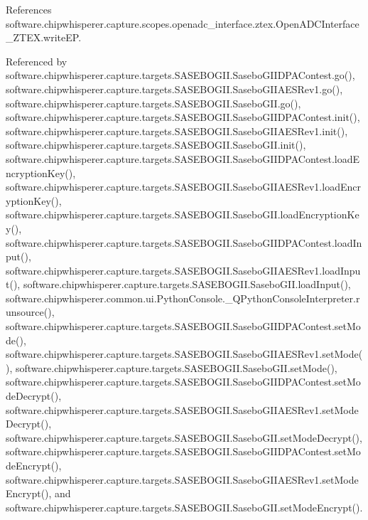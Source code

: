 References software.\+chipwhisperer.\+capture.\+scopes.\+openadc\+\_\+interface.\+ztex.\+Open\+A\+D\+C\+Interface\+\_\+\+Z\+T\+E\+X.\+write\+E\+P.



Referenced by software.\+chipwhisperer.\+capture.\+targets.\+S\+A\+S\+E\+B\+O\+G\+I\+I.\+Sasebo\+G\+I\+I\+D\+P\+A\+Contest.\+go(), software.\+chipwhisperer.\+capture.\+targets.\+S\+A\+S\+E\+B\+O\+G\+I\+I.\+Sasebo\+G\+I\+I\+A\+E\+S\+Rev1.\+go(), software.\+chipwhisperer.\+capture.\+targets.\+S\+A\+S\+E\+B\+O\+G\+I\+I.\+Sasebo\+G\+I\+I.\+go(), software.\+chipwhisperer.\+capture.\+targets.\+S\+A\+S\+E\+B\+O\+G\+I\+I.\+Sasebo\+G\+I\+I\+D\+P\+A\+Contest.\+init(), software.\+chipwhisperer.\+capture.\+targets.\+S\+A\+S\+E\+B\+O\+G\+I\+I.\+Sasebo\+G\+I\+I\+A\+E\+S\+Rev1.\+init(), software.\+chipwhisperer.\+capture.\+targets.\+S\+A\+S\+E\+B\+O\+G\+I\+I.\+Sasebo\+G\+I\+I.\+init(), software.\+chipwhisperer.\+capture.\+targets.\+S\+A\+S\+E\+B\+O\+G\+I\+I.\+Sasebo\+G\+I\+I\+D\+P\+A\+Contest.\+load\+Encryption\+Key(), software.\+chipwhisperer.\+capture.\+targets.\+S\+A\+S\+E\+B\+O\+G\+I\+I.\+Sasebo\+G\+I\+I\+A\+E\+S\+Rev1.\+load\+Encryption\+Key(), software.\+chipwhisperer.\+capture.\+targets.\+S\+A\+S\+E\+B\+O\+G\+I\+I.\+Sasebo\+G\+I\+I.\+load\+Encryption\+Key(), software.\+chipwhisperer.\+capture.\+targets.\+S\+A\+S\+E\+B\+O\+G\+I\+I.\+Sasebo\+G\+I\+I\+D\+P\+A\+Contest.\+load\+Input(), software.\+chipwhisperer.\+capture.\+targets.\+S\+A\+S\+E\+B\+O\+G\+I\+I.\+Sasebo\+G\+I\+I\+A\+E\+S\+Rev1.\+load\+Input(), software.\+chipwhisperer.\+capture.\+targets.\+S\+A\+S\+E\+B\+O\+G\+I\+I.\+Sasebo\+G\+I\+I.\+load\+Input(), software.\+chipwhisperer.\+common.\+ui.\+Python\+Console.\+\_\+\+Q\+Python\+Console\+Interpreter.\+runsource(), software.\+chipwhisperer.\+capture.\+targets.\+S\+A\+S\+E\+B\+O\+G\+I\+I.\+Sasebo\+G\+I\+I\+D\+P\+A\+Contest.\+set\+Mode(), software.\+chipwhisperer.\+capture.\+targets.\+S\+A\+S\+E\+B\+O\+G\+I\+I.\+Sasebo\+G\+I\+I\+A\+E\+S\+Rev1.\+set\+Mode(), software.\+chipwhisperer.\+capture.\+targets.\+S\+A\+S\+E\+B\+O\+G\+I\+I.\+Sasebo\+G\+I\+I.\+set\+Mode(), software.\+chipwhisperer.\+capture.\+targets.\+S\+A\+S\+E\+B\+O\+G\+I\+I.\+Sasebo\+G\+I\+I\+D\+P\+A\+Contest.\+set\+Mode\+Decrypt(), software.\+chipwhisperer.\+capture.\+targets.\+S\+A\+S\+E\+B\+O\+G\+I\+I.\+Sasebo\+G\+I\+I\+A\+E\+S\+Rev1.\+set\+Mode\+Decrypt(), software.\+chipwhisperer.\+capture.\+targets.\+S\+A\+S\+E\+B\+O\+G\+I\+I.\+Sasebo\+G\+I\+I.\+set\+Mode\+Decrypt(), software.\+chipwhisperer.\+capture.\+targets.\+S\+A\+S\+E\+B\+O\+G\+I\+I.\+Sasebo\+G\+I\+I\+D\+P\+A\+Contest.\+set\+Mode\+Encrypt(), software.\+chipwhisperer.\+capture.\+targets.\+S\+A\+S\+E\+B\+O\+G\+I\+I.\+Sasebo\+G\+I\+I\+A\+E\+S\+Rev1.\+set\+Mode\+Encrypt(), and software.\+chipwhisperer.\+capture.\+targets.\+S\+A\+S\+E\+B\+O\+G\+I\+I.\+Sasebo\+G\+I\+I.\+set\+Mode\+Encrypt().


